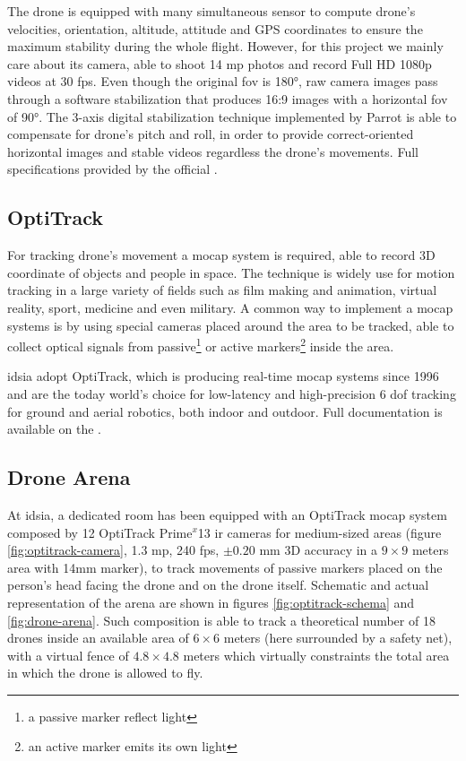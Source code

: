 The drone is equipped with many simultaneous sensor to compute drone's velocities, orientation, altitude, attitude and GPS coordinates to ensure the maximum stability during the whole flight. However, for this project we mainly care about its camera, able to shoot 14 \gls{mp} photos and record Full HD 1080p videos at 30 \gls{fps}. Even though the original \gls{fov} is 180°, raw camera images pass through a software stabilization that produces 16:9 images with a horizontal \gls{fov} of 90°. The 3-axis digital stabilization technique implemented by Parrot is able to compensate for drone's pitch and roll, in order to provide correct-oriented horizontal images and stable videos regardless the drone's movements. Full specifications provided by the official \cite{bebop}.

  

\subsection{OptiTrack}
\label{subsec:optitrack}

For tracking drone's movement a \gls{mocap} system is required, able to record 3D coordinate of objects and people in space. The technique is widely use for motion tracking in a large variety of fields such as film making and animation, virtual reality, sport, medicine and even military. A common way to implement a \gls{mocap} systems is by using special cameras placed around the area to be tracked, able to collect optical signals from passive\footnote{a passive marker reflect light} or active markers\footnote{an active marker emits its own light} inside the area.

\medskip

\gls{idsia} adopt OptiTrack, which is producing real-time \gls{mocap} systems since 1996 and are the today world’s choice for low-latency and high-precision 6 \gls{dof} tracking for ground and aerial robotics, both indoor and outdoor. Full documentation is available on the \cite{optitrack}.



\subsection{Drone Arena}
\label{subsec:drone-arena}

At \gls{idsia}, a dedicated room has been equipped with an OptiTrack \gls{mocap} system composed by 12 OptiTrack Prime$^x$13 \gls{ir} cameras for medium-sized areas (figure \ref{fig:optitrack-camera}, 1.3 \gls{mp}, 240 \gls{fps}, $\pm0.20$ mm 3D accuracy in a $9 \times 9$ meters area with 14mm marker), to track movements of passive markers placed on the person's head facing the drone and on the drone itself. Schematic and actual representation of the arena are shown in figures \ref{fig:optitrack-schema} and \ref{fig:drone-arena}. Such composition is able to track a theoretical number of 18 drones inside an available area of $6 \times 6$ meters (here surrounded by a safety net), with a virtual fence of $4.8 \times 4.8$ meters which virtually constraints the total area in which the drone is allowed to fly.

